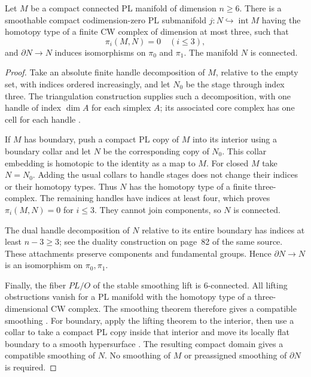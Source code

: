 \begin{lemma}\label{lem:component-followup-handle-core}
Let $M$ be a compact connected PL manifold of dimension $n\geq6$.
There is a smoothable compact codimension-zero PL submanifold
$j:N\hookrightarrow\operatorname{int}M$ having the homotopy type of a
finite CW complex of dimension at most three, such that
\[
                         \pi_i(M,N)=0\quad(i\leq3),
\]
and $\partial N\to N$ induces isomorphisms on $\pi_0$ and $\pi_1$.
The manifold $N$ is connected.
\end{lemma}

\begin{proof}
Take an absolute finite handle decomposition of $M$, relative to the
empty set, with indices ordered increasingly, and let $N_0$ be the
stage through index three.  The triangulation construction supplies
such a decomposition, with one handle of index $\dim A$ for each
simplex $A$; its associated core complex has one cell for each handle
\cite[Proposition~6.9 and the following discussion,
pp.~82--83]{RourkeSanderson1982Component}.

If $M$ has boundary, push a compact PL copy of $M$ into its interior
using a boundary collar and let $N$ be the corresponding copy of
$N_0$.  This collar embedding is homotopic to the identity as a map to
$M$.  For closed $M$ take $N=N_0$.  Adding the usual collars to handle
stages does not change their indices or their homotopy types.
Thus $N$ has the homotopy type of a finite three-complex.  The remaining
handles have indices at least four, which proves
$\pi_i(M,N)=0$ for $i\leq3$.  They cannot join components, so $N$ is
connected.

The dual handle decomposition of $N$ relative to its entire boundary
has indices at least $n-3\geq3$; see the duality construction on
page~82 of the same source.  These attachments preserve components
and fundamental groups.  Hence $\partial N\to N$ is an isomorphism on
$\pi_0,\pi_1$.

Finally, the fiber $PL/O$ of the stable smoothing lift is
6-connected.  All lifting obstructions vanish for a PL manifold with
the homotopy type of a three-dimensional CW complex.  The smoothing
theorem therefore gives a compatible smoothing
\cite[Part~II, Theorem~4.1, p.~108, and \S5.3,
pp.~122--123]{HirschMazur1974}.
For boundary, apply the lifting theorem to the interior, then use a
collar to take a compact PL copy inside that interior and move its
locally flat boundary to a smooth hypersurface
\cite[Part~I, Theorem~7.4, pp.~37--38]{HirschMazur1974}.
The resulting compact domain gives a compatible smoothing of $N$.
No smoothing of $M$ or preassigned smoothing of $\partial N$ is required.
\end{proof}

